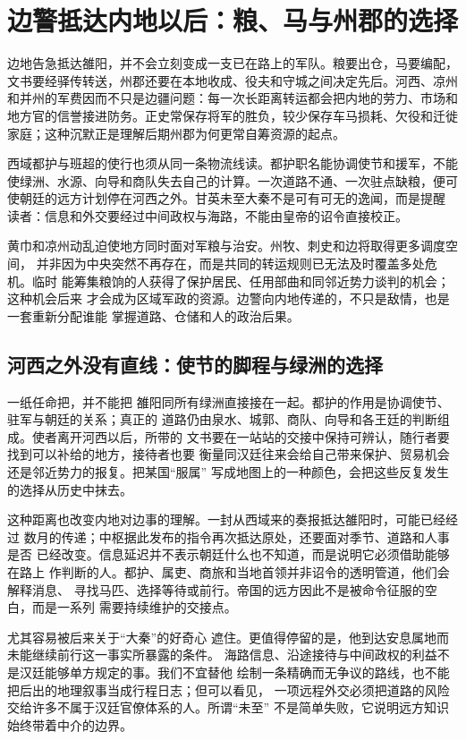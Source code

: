 \section{边警抵达内地以后：粮、马与州郡的选择}
\label{sec:eastern-logistics-interior}

边地告急抵达雒阳，并不会立刻变成一支已在路上的军队。粮要出仓，马要编配，
文书要经驿传转送，州郡还要在本地收成、役夫和守城之间决定先后。河西、凉州
和并州的军费因而不只是边疆问题：每一次长距离转运都会把内地的劳力、市场和
地方官的信誉接进防务。正史常保存将军的胜负，较少保存车马损耗、欠役和迁徙
家庭；这种沉默正是理解后期州郡为何更常自筹资源的起点。

西域都护与班超的使行也须从同一条物流线读。都护职名能协调使节和援军，不能
使绿洲、水源、向导和商队失去自己的计算。一次道路不通、一次驻点缺粮，便可
使朝廷的远方计划停在河西之外。甘英未至大秦不是可有可无的逸闻，而是提醒
读者：信息和外交要经过中间政权与海路，不能由皇帝的诏令直接校正。

黄巾和凉州动乱迫使地方同时面对军粮与治安。州牧、刺史和边将取得更多调度空间，
并非因为中央突然不再存在，而是共同的转运规则已无法及时覆盖多处危机。临时
能筹集粮饷的人获得了保护居民、任用部曲和同邻近势力谈判的机会；这种机会后来
才会成为区域军政的资源。边警向内地传递的，不只是敌情，也是一套重新分配谁能
掌握道路、仓储和人的政治后果。

\subsection{河西之外没有直线：使节的脚程与绿洲的选择}

一纸任命把，并不能把
雒阳同所有绿洲直接接在一起。都护的作用是协调使节、驻军与朝廷的关系；真正的
道路仍由泉水、城郭、商队、向导和各王廷的判断组成。使者离开河西以后，所带的
文书要在一站站的交接中保持可辨认，随行者要找到可以补给的地方，接待者也要
衡量同汉廷往来会给自己带来保护、贸易机会还是邻近势力的报复。把某国“服属”
写成地图上的一种颜色，会把这些反复发生的选择从历史中抹去。

这种距离也改变内地对边事的理解。一封从西域来的奏报抵达雒阳时，可能已经经过
数月的传递；中枢据此发布的指令再次抵达原处，还要面对季节、道路和人事是否
已经改变。信息延迟并不表示朝廷什么也不知道，而是说明它必须借助能够在路上
作判断的人。都护、属吏、商旅和当地首领并非诏令的透明管道，他们会解释消息、
寻找马匹、选择等待或前行。帝国的远方因此不是被命令征服的空白，而是一系列
需要持续维护的交接点。

尤其容易被后来关于“大秦”的好奇心
遮住。更值得停留的是，他到达安息属地而未能继续前行这一事实所暴露的条件。
海路信息、沿途接待与中间政权的利益不是汉廷能够单方规定的事。我们不宜替他
绘制一条精确而无争议的路线，也不能把后出的地理叙事当成行程日志；但可以看见，
一项远程外交必须把道路的风险交给许多不属于汉廷官僚体系的人。所谓“未至”
不是简单失败，它说明远方知识始终带着中介的边界。

